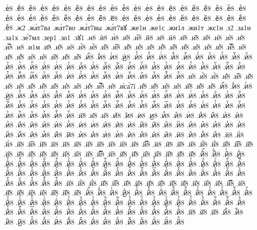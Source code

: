 {.еⷢ8
.еⷣ8
.еⷤ8
.еⷥ8
.еⷦ8
.еⷧ8
.еⷨ8
.еⷩ8
.еⷪ8
.еⷫ8
.еⷬ8
.еⷭ8
.еⷮ8
.еⷯ8
.еⷰ8
.еⷱ8
.еⷲ8
.еⷳ8
.еⷴ8
.еⷵ8
.еⷶ8
.еⷷ8
.еⷸ8
.еⷹ8
.еⷺ8
.еⷻ8
.еⷼ8
.еⷽ8
.еⷾ8
.еⷿ8
.е꙯8
.еꙴ8
.еꙵ8
.еꙶ8
.еꙷ8
.еꙸ8
.еꙹ8
.еꙺ8
.еꙻ8
.е꙼8
.е꙽8
.еꚞ8
.еꚟ8
.ж2
.жа́т7ва
.жа́т7во
.жа́т7вы
.жа́т7вꙋ
.же1н
.же1с
.жи1л
.жи1т
.жє1н
.з2
.за1н
.за1х
.зе́7мл
.зер1
.зо1
.зꙋ1
.и8
.ѝ8
.и́8
.и̂8
.и̅8
.й8
.и̇8
.ӥ8
.и̋8
.и̏8
.и̑8
.и̓8
.и̔8
.и̾8
.и̿8
.и͘8
.и1м
.и҃8
.и҄8
.и҅8
.и҅̀8
.и҅́8
.и҅̂8
.и҅̅8
.и҅̆8
.и҅̇8
.и҅̈8
.и҅̋8
.и҅̏8
.и҅̑8
.и҅̓8
.и҅̔8
.и҅̾8
.и҅̿8
.и҅͘8
.и҅҃8
.и҅҄8
.и҅҅8
.и҅҆8
.и҅҇8
.и҅᷀8
.и҅᷁8
.и҅᷶8
.и᷷҅8
.и᷸҅8
.и᷹҅8
.и҅ⷠ8
.и҅ⷡ8
.и҅ⷢ8
.и҅ⷣ8
.и҅ⷤ8
.и҅ⷥ8
.и҅ⷦ8
.и҅ⷧ8
.и҅ⷨ8
.и҅ⷩ8
.и҅ⷪ8
.и҅ⷫ8
.и҅ⷬ8
.и҅ⷭ8
.и҅ⷮ8
.и҅ⷯ8
.и҅ⷰ8
.и҅ⷱ8
.и҅ⷲ8
.и҅ⷳ8
.и҅ⷴ8
.и҅ⷵ8
.и҅ⷶ8
.и҅ⷷ8
.и҅ⷸ8
.и҅ⷹ8
.и҅ⷺ8
.и҅ⷻ8
.и҅ⷼ8
.и҅ⷽ8
.и҅ⷾ8
.и҅ⷿ8
.и҅꙯8
.и҅ꙴ8
.и҅ꙵ8
.и҅ꙶ8
.и҅ꙷ8
.и҅ꙸ8
.и҅ꙹ8
.и҅ꙺ8
.и҅ꙻ8
.и҅꙼8
.и҅꙽8
.и҅ꚞ8
.и҅ꚟ8
.и҆8
.и҆̀8
.и҆́8
.и҆̂8
.и҆̅8
.и҆̆8
.и҆̇8
.и҆̈8
.и҆̋8
.и҆̏8
.и҆̑8
.и҆̓8
.и҆̔8
.и҆̾8
.и҆̿8
.и҆͘8
.и҆са́7ї
.и҆҃8
.и҆҄8
.и҆҅8
.и҆҆8
.и҆҇8
.и҆᷀8
.и҆᷁8
.и҆᷶8
.и᷷҆8
.и᷸҆8
.и᷹҆8
.и҆ⷠ8
.и҆ⷡ8
.и҆ⷢ8
.и҆ⷣ8
.и҆ⷤ8
.и҆ⷥ8
.и҆ⷦ8
.и҆ⷧ8
.и҆ⷨ8
.и҆ⷩ8
.и҆ⷪ8
.и҆ⷫ8
.и҆ⷬ8
.и҆ⷭ8
.и҆ⷮ8
.и҆ⷯ8
.и҆ⷰ8
.и҆ⷱ8
.и҆ⷲ8
.и҆ⷳ8
.и҆ⷴ8
.и҆ⷵ8
.и҆ⷶ8
.и҆ⷷ8
.и҆ⷸ8
.и҆ⷹ8
.и҆ⷺ8
.и҆ⷻ8
.и҆ⷼ8
.и҆ⷽ8
.и҆ⷾ8
.и҆ⷿ8
.и҆꙯8
.и҆ꙴ8
.и҆ꙵ8
.и҆ꙶ8
.и҆ꙷ8
.и҆ꙸ8
.и҆ꙹ8
.и҆ꙺ8
.и҆ꙻ8
.и҆꙼8
.и҆꙽8
.и҆ꚞ8
.и҆ꚟ8
.и҇8
.и᷀8
.и᷁8
.и᷶8
.и᷷8
.и᷸8
.и᷹8
.иⷠ8
.иⷡ8
.иⷢ8
.иⷣ8
.иⷤ8
.иⷥ8
.иⷦ8
.иⷧ8
.иⷨ8
.иⷩ8
.иⷪ8
.иⷫ8
.иⷬ8
.иⷭ8
.иⷮ8
.иⷯ8
.иⷰ8
.иⷱ8
.иⷲ8
.иⷳ8
.иⷴ8
.иⷵ8
.иⷶ8
.иⷷ8
.иⷸ8
.иⷹ8
.иⷺ8
.иⷻ8
.иⷼ8
.иⷽ8
.иⷾ8
.иⷿ8
.и꙯8
.иꙴ8
.иꙵ8
.иꙶ8
.иꙷ8
.иꙸ8
.иꙹ8
.иꙺ8
.иꙻ8
.и꙼8
.и꙽8
.иꚞ8
.иꚟ8
.й8
.й̀8
.й́8
.й̂8
.й̅8
.й̆8
.й̇8
.й̈8
.й̋8
.й̏8
.й̑8
.й̓8
.й̔8
.й̾8
.й̿8
.й͘8
.й҃8
.й҄8
.й҅8
.й҅̀8
.й҅́8
.й҅̂8
.й҅̅8
.й҅̆8
.й҅̇8
.й҅̈8
.й҅̋8
.й҅̏8
.й҅̑8
.й҅̓8
.й҅̔8
.й҅̾8
.й҅̿8
.й҅͘8
.й҅҃8
.й҅҄8
.й҅҅8
.й҅҆8
.й҅҇8
.й҅᷀8
.й҅᷁8
.й҅᷶8
.й᷷҅8
.й᷸҅8
.й᷹҅8
.й҅ⷠ8
.й҅ⷡ8
.й҅ⷢ8
.й҅ⷣ8
.й҅ⷤ8
.й҅ⷥ8
.й҅ⷦ8
.й҅ⷧ8
.й҅ⷨ8
.й҅ⷩ8
.й҅ⷪ8
.й҅ⷫ8
.й҅ⷬ8
.й҅ⷭ8
.й҅ⷮ8
.й҅ⷯ8
.й҅ⷰ8
.й҅ⷱ8
.й҅ⷲ8
.й҅ⷳ8
.й҅ⷴ8
.й҅ⷵ8
.й҅ⷶ8
.й҅ⷷ8
.й҅ⷸ8
.й҅ⷹ8
.й҅ⷺ8
.й҅ⷻ8
.й҅ⷼ8
.й҅ⷽ8
.й҅ⷾ8
.й҅ⷿ8
.й҅꙯8
.й҅ꙴ8
.й҅ꙵ8
.й҅ꙶ8
.й҅ꙷ8
.й҅ꙸ8
.й҅ꙹ8
.й҅ꙺ8
.й҅ꙻ8
.й҅꙼8
.й҅꙽8
.й҅ꚞ8
.й҅ꚟ8
.й҆8
.й҆̀8
.й҆́8
.й҆̂8
.й҆̅8
.й҆̆8
.й҆̇8
.й҆̈8
.й҆̋8
.й҆̏8
.й҆̑8
.й҆̓8
.й҆̔8
.й҆̾8
.й҆̿8
.й҆͘8
.й҆҃8
.й҆҄8
.й҆҅8
.й҆҆8
.й҆҇8
.й҆᷀8
.й҆᷁8
.й҆᷶8
.й᷷҆8
.й᷸҆8
.й᷹҆8
.й҆ⷠ8
.й҆ⷡ8
.й҆ⷢ8
.й҆ⷣ8
.й҆ⷤ8
.й҆ⷥ8
.й҆ⷦ8
.й҆ⷧ8
.й҆ⷨ8
.й҆ⷩ8
.й҆ⷪ8
.й҆ⷫ8
.й҆ⷬ8
.й҆ⷭ8
.й҆ⷮ8
.й҆ⷯ8
.й҆ⷰ8
.й҆ⷱ8
.й҆ⷲ8
.й҆ⷳ8
.й҆ⷴ8
.й҆ⷵ8
.й҆ⷶ8
.й҆ⷷ8
.й҆ⷸ8
.й҆ⷹ8
.й҆ⷺ8
.й҆ⷻ8
.й҆ⷼ8
.й҆ⷽ8
.й҆ⷾ8
.й҆ⷿ8
.й҆꙯8
.й҆ꙴ8
.й҆ꙵ8
.й҆ꙶ8
.й҆ꙷ8
.й҆ꙸ8
.й҆ꙹ8
.й҆ꙺ8
.й҆ꙻ8
.й҆꙼8
.й҆꙽8
.й҆ꚞ8
.й҆ꚟ8
.й҇8
.й᷀8
.й᷁8
.й᷶8
.й᷷8
.й᷸8
.й᷹8
.йⷠ8
.йⷡ8
.йⷢ8
.йⷣ8
.йⷤ8
.йⷥ8
.йⷦ8
.йⷧ8
.йⷨ8
.йⷩ8
.йⷪ8
.йⷫ8
.йⷬ8
}
